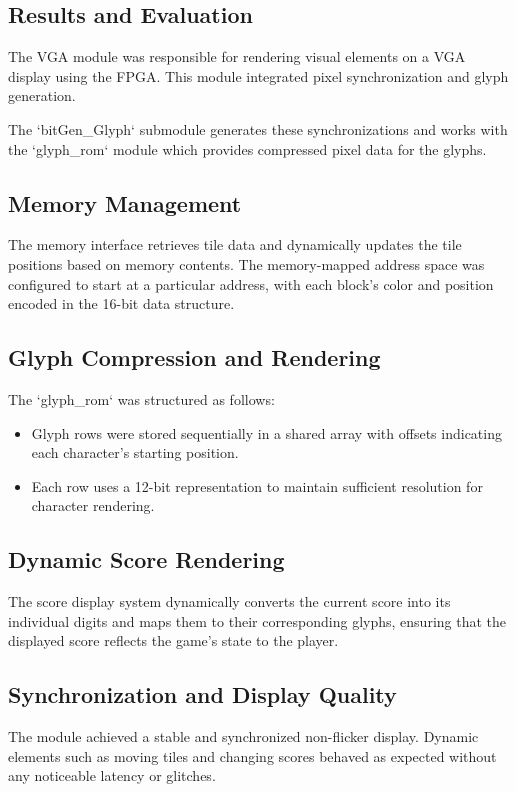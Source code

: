 \documentclass{subfile}
\begin{document}
  \subsection{Results and Evaluation}

  The VGA module was responsible for rendering visual elements on a VGA display using the FPGA. This module integrated pixel synchronization and glyph generation.

  The `bitGen\_Glyph` submodule generates these synchronizations and works with the `glyph\_rom` module which provides compressed pixel data for the glyphs.

  \subsection{Memory Management}
  The memory interface retrieves tile data and dynamically updates the tile positions based on memory contents. The memory-mapped address space was configured to start at a particular address, with each block's color and position encoded in the 16-bit data structure. 

  \subsection{Glyph Compression and Rendering}
  The `glyph\_rom` was structured as follows:
  \begin{itemize}
      \item Glyph rows were stored sequentially in a shared array with offsets indicating each character's starting position.
      \item Each row uses a 12-bit representation to maintain sufficient resolution for character rendering.
  \end{itemize}

  \subsection{Dynamic Score Rendering}
  The score display system dynamically converts the current score into its individual digits and maps them to their corresponding glyphs, ensuring that the displayed score reflects the game's state to the player. 

  \subsection{Synchronization and Display Quality}
  The module achieved a stable and synchronized non-flicker display. Dynamic elements such as moving tiles and changing scores behaved as expected without any noticeable latency or glitches.
\end{document}
